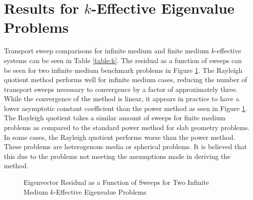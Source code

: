 \section{Results for $k$-Effective Eigenvalue Problems}
Transport sweep comparisons for infinite medium and finite medium $k$-effective systems can be seen in Table \ref{table:k}. The residual as a function of sweeps can be seen for two infinite medium benchmark problems in Figure \ref{fig:kRes}. The Rayleigh quotient method performs well for infinite medium cases, reducing the number of transport sweeps necessary to convergence by a factor of approximately three. While the convergence of the method is linear, it appears in practice to have a lower asymptotic constant coefficient than the power method as seen in Figure \ref{fig:kRes}. The Rayleigh quotient takes a similar amount of sweeps for finite medium problems as compared to the standard power method for slab geometry problems. In some cases, the Rayleigh quotient performs worse than the power method. These problems are heterogenous media or spherical problems. It is believed that this due to the problems not meeting the assumptions made in deriving the method.

\begin{figure}[]
	\centering
	\resizebox{!}{0.45\textheight}{
		
	}
	\caption{Eigenvector Residual as a Function of Sweeps for Two Infinite Medium $k$-Effective Eigenvalue Problems}
	\label{fig:kRes}
\end{figure}


